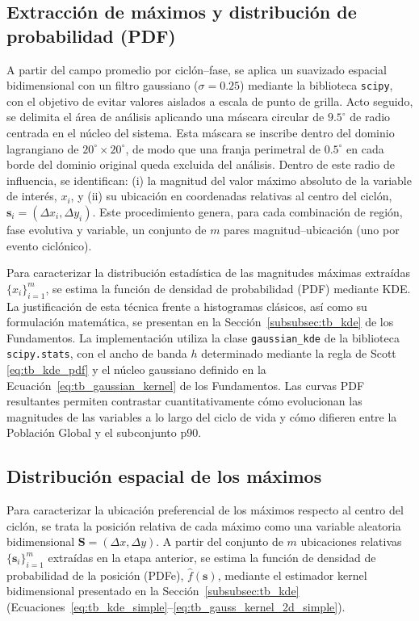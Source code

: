 \subsection{Extracción de máximos y distribución de probabilidad (PDF)}\label{subsec:extraccion_pdf}

A partir del campo promedio por ciclón--fase, se aplica un suavizado espacial bidimensional con un filtro gaussiano ($\sigma = 0.25$) mediante la biblioteca \texttt{scipy}, con el objetivo de evitar valores aislados a escala de punto de grilla. Acto seguido, se delimita el área de análisis aplicando una máscara circular de $9.5^{\circ}$ de radio centrada en el núcleo del sistema. Esta máscara se inscribe dentro del dominio lagrangiano de $20^{\circ} \times 20^{\circ}$, de modo que una franja perimetral de $0.5^{\circ}$ en cada borde del dominio original queda excluida del análisis. Dentro de este radio de influencia, se identifican: (i) la magnitud del valor máximo absoluto de la variable de interés, $x_i$, y (ii) su ubicación en coordenadas relativas al centro del ciclón, $\mathbf{s}_i = (\Delta x_i, \Delta y_i)$. Este procedimiento genera, para cada combinación de región, fase evolutiva y variable, un conjunto de $m$ pares magnitud--ubicación (uno por evento ciclónico).

Para caracterizar la distribución estadística de las magnitudes máximas extraídas $\{x_i\}_{i=1}^{m}$, se estima la función de densidad de probabilidad (PDF) mediante KDE. La justificación de esta técnica frente a histogramas clásicos, así como su formulación matemática, se presentan en la Sección~\ref{subsubsec:tb_kde} de los Fundamentos. La implementación utiliza la clase \texttt{gaussian\_kde} de la biblioteca \texttt{scipy.stats}, con el ancho de banda $h$ determinado mediante la regla de Scott \ref{eq:tb_kde_pdf} y el núcleo gaussiano definido en la Ecuación~\ref{eq:tb_gaussian_kernel} de los Fundamentos. Las curvas PDF resultantes permiten contrastar cuantitativamente cómo evolucionan las magnitudes de las variables a lo largo del ciclo de vida y cómo difieren entre la Población Global y el subconjunto p90.

\subsection{Distribución espacial de los máximos}\label{subsec:kde_localizacion}

Para caracterizar la ubicación preferencial de los máximos respecto al centro del ciclón, se trata la posición relativa de cada máximo como una variable aleatoria bidimensional $\mathbf{S} = (\Delta x, \Delta y)$. A partir del conjunto de $m$ ubicaciones relativas $\{\mathbf{s}_i\}_{i=1}^{m}$ extraídas en la etapa anterior, se estima la función de densidad de probabilidad de la posición (PDFe), $\hat{f}(\mathbf{s})$, mediante el estimador kernel bidimensional presentado en la Sección~\ref{subsubsec:tb_kde} (Ecuaciones~\ref{eq:tb_kde_simple}--\ref{eq:tb_gauss_kernel_2d_simple}).


